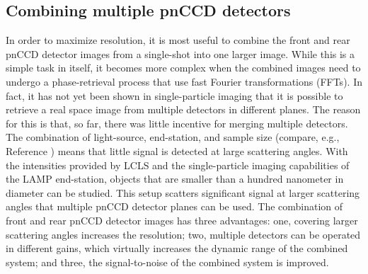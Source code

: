 \subsection{Combining multiple pnCCD detectors}\label{sec:combination-of-images}
In order to maximize resolution, it is most useful to combine the front and rear pnCCD detector images from a single-shot into one larger image. While this is a simple task in itself, it becomes more complex when the combined images need to undergo a phase-retrieval process that use fast Fourier transformations (FFTs). In fact, it has not yet been shown in single-particle imaging that it is possible to retrieve a real space image from multiple detectors in different planes.
The reason for this is that, so far, there was little incentive for merging multiple detectors. The combination of light-source, end-station, and sample size (compare, e.g., Reference \cite{Seibert-2011-Nature}) means that little signal is detected at large scattering angles. With the intensities provided by LCLS and the single-particle imaging capabilities of the LAMP end-station, objects that are smaller than a hundred nanometer in diameter can be studied. This setup scatters significant signal at larger scattering angles that multiple pnCCD detector planes can be used.
The combination of front and rear pnCCD detector images has three advantages: one, covering larger scattering angles increases the resolution; two, multiple detectors can be operated in different gains, which virtually increases the dynamic range of the combined system; and three, the signal-to-noise of the combined system is improved.\\[1\baselineskip]

